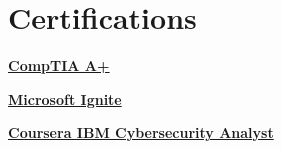 \documentclass[a4paper]{Resume}
\begin{document}
\sectionsep




\section{Certifications} 
\hrulefill 

\pt \href{https://www.udemy.com/certificate/UC-98f894dc-4e81-4be3-aeb9-21b391568400/}{\textbf{CompTIA A+}}

\pt \href{https://www.udemy.com/certificate/UC-98f894dc-4e81-4be3-aeb9-21b391568400/}{\textbf{Microsoft Ignite}}

\pt \href{https://www.udemy.com/certificate/UC-98f894dc-4e81-4be3-aeb9-21b391568400/}{\textbf{Coursera IBM Cybersecurity Analyst}} 
\end{document}

